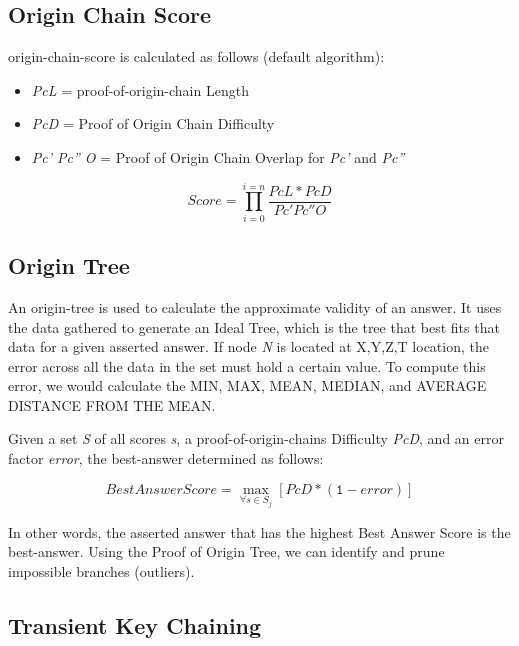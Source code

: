 \documentclass{article}
\begin{document}
\subsection {Origin Chain Score}
\Gls{origin-chain-score} is calculated as follows (default algorithm):

\begin{itemize}
\item \textit{PcL} = \Gls{proof-of-origin-chain} Length
\item \textit{PcD} = Proof of Origin Chain Difficulty
\item \textit{Pc' Pc'' O} = Proof of Origin Chain Overlap for \textit{Pc'} and \textit{Pc''}
\end{itemize}

\begin{equation*}\tag{1} \label{eq1}
Score = \prod_{i=0}^{i=n} \frac{PcL*PcD}{Pc' Pc'' O}
\end{equation*}

\subsection {Origin Tree}
An \Gls{origin-tree} is used to calculate the approximate validity of an answer. It uses the data gathered to generate an Ideal Tree, which is the tree that best fits that data for a given asserted answer. If node \textit{N} is located at X,Y,Z,T location, the error across all the data in the set must hold a certain value. To compute this error, we would calculate the MIN, MAX, MEAN, MEDIAN, and AVERAGE DISTANCE FROM THE MEAN.

Given a set \textit{S} of all scores \textit{s}, a \Glspl{proof-of-origin-chain} Difficulty \textit{PcD}, and an error factor \textit{error}, the \Gls{best-answer} determined as follows:

\begin{equation*}\tag{2} \label{eq2}
Best Answer Score = \max_{\forall s \in S_j}[PcD * (\texttt{1} - error)]
\end{equation*}

In other words, the asserted answer that has the highest Best Answer Score is the \Gls{best-answer}. Using the Proof of Origin Tree, we can identify and prune impossible branches (outliers).

\subsection{Transient Key Chaining}
\end{document}
